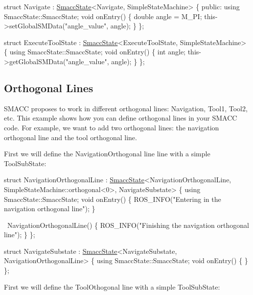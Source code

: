 \begin{DoxyCode}
\textcolor{keyword}{struct }Navigate : \hyperlink{classSmaccState}{SmaccState}<Navigate, SimpleStateMachine>
\{
\textcolor{keyword}{public}:
  \textcolor{keyword}{using} SmaccState::SmaccState;
  \textcolor{keywordtype}{void} onEntry()
  \{
        \textcolor{keywordtype}{double} angle = M\_PI;
        this->setGlobalSMData(\textcolor{stringliteral}{"angle\_value"}, angle);
  \}
\};

\textcolor{keyword}{struct }ExecuteToolState : \hyperlink{classSmaccState}{SmaccState}<ExecuteToolState, SimpleStateMachine>
\{
    \textcolor{keyword}{using} SmaccState::SmaccState;
    \textcolor{keywordtype}{void} onEntry()
    \{
         \textcolor{keywordtype}{int} angle;
         this->getGlobalSMData(\textcolor{stringliteral}{"angle\_value"}, angle);
    \}
\};
\end{DoxyCode}


\subsection*{Orthogonal Lines}

S\+M\+A\+CC proposes to work in different orthogonal lines\+: Navigation, Tool1, Tool2, etc. This example shows how you can define orthogonal lines in your S\+M\+A\+CC code. For example, we want to add two orthogonal lines\+: the navigation orthogonal line and the tool orthogonal line.

 

First we will define the Navigation\+Orthogonal line line with a simple Tool\+Sub\+State\+:


\begin{DoxyCode}
\textcolor{keyword}{struct }NavigationOrthogonalLine
    : \hyperlink{classSmaccState}{SmaccState}<NavigationOrthogonalLine, SimpleStateMachine::orthogonal<0>, NavigateSubstate> \{
  \textcolor{keyword}{using} SmaccState::SmaccState;
  \textcolor{keywordtype}{void} onEntry()                 
  \{
    ROS\_INFO(\textcolor{stringliteral}{"Entering in the navigation orthogonal line"});
  \}

  ~NavigationOrthogonalLine() 
  \{
    ROS\_INFO(\textcolor{stringliteral}{"Finishing the navigation orthogonal line"});
  \}
\};

\textcolor{keyword}{struct }NavigateSubstate : \hyperlink{classSmaccState}{SmaccState}<NavigateSubstate, NavigationOrthogonalLine> 
\{
    \textcolor{keyword}{using} SmaccState::SmaccState;
    \textcolor{keywordtype}{void} onEntry()
    \{
    \}
\};
\end{DoxyCode}
 First we will define the Tool\+Othogonal line with a simple Tool\+Sub\+State\+:


